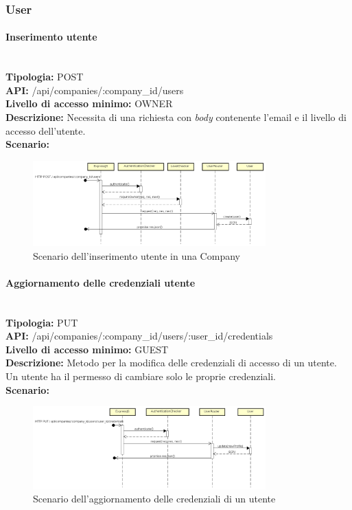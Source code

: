 \newpage
\subsubsection{User}

\paragraph{Inserimento utente}\mbox{}\\
\textbf{Tipologia:} POST \\
\textbf{API:} /api/companies/:company\_id/users \\
\textbf{Livello di accesso minimo:} OWNER \\
\textbf{Descrizione:} Necessita di una richiesta con \textit{body} contenente l'email e il livello di accesso dell'utente.\\
\textbf{Scenario:} 
\begin{figure}[H]
\centering
\includegraphics[width=0.8\textwidth]{res/sections/backend/sequence/(POST)user.png}
\caption{Scenario dell'inserimento utente in una Company}
\end{figure}

\newpage
\paragraph{Aggiornamento delle credenziali utente}\mbox{}\\
\textbf{Tipologia:} PUT \\
\textbf{API:} /api/companies/:company\_id/users/:user\_id/credentials \\
\textbf{Livello di accesso minimo:} GUEST \\
\textbf{Descrizione:} Metodo per la modifica delle credenziali di accesso di un utente. Un utente ha il permesso di cambiare solo le proprie credenziali. \\
\textbf{Scenario:} 
\begin{figure}[H]
\centering
\includegraphics[width=0.8\textwidth]{res/sections/backend/sequence/(PUT)credenzialiUtente.png}
\caption{Scenario dell'aggiornamento delle credenziali di un utente}
\end{figure}

